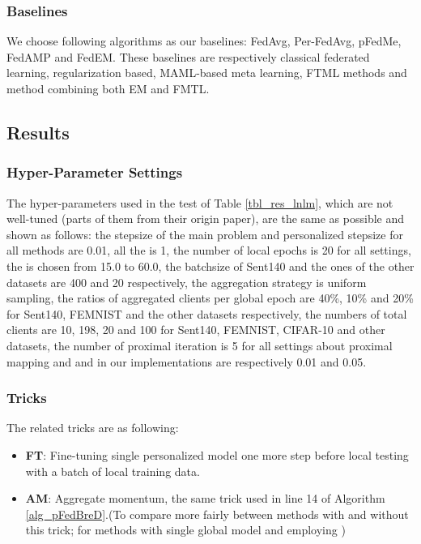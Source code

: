 \documentclass{article}
\begin{document}
\subsubsection{Baselines}
\label{sssec_bl}

We choose following algorithms as our baselines: FedAvg, Per-FedAvg, pFedMe, FedAMP and FedEM\cite{marfoq2021federated}. These baselines are respectively classical federated learning, regularization based, MAML-based meta learning, FTML methods and method combining both EM and FMTL.

\subsection{Results}
\label{ssec_expr}

\subsubsection{Hyper-Parameter Settings}
\label{sssec_hps}

The hyper-parameters used in the test of Table \ref{tbl_res_lnlm}, which are not well-tuned (parts of them from their origin paper), are the same as possible and shown as follows: the stepsize of the main problem  and personalized stepsize  for all methods are 0.01, all the  is 1, the number of local epochs  is 20 for all settings, the  is chosen from 15.0 to 60.0, the batchsize of Sent140 and the ones of the other datasets are 400 and 20 respectively, the aggregation strategy  is uniform sampling, the ratios of aggregated clients per global epoch are 40\%, 10\% and 20\% for Sent140, FEMNIST and the other datasets respectively, the numbers of total clients  are 10, 198, 20 and 100 for Sent140, FEMNIST, CIFAR-10 and other datasets, the number of proximal iteration is 5 for all settings about proximal mapping and  and  in our implementations are respectively 0.01 and 0.05.

\subsubsection{Tricks}
\label{sssec_tricks}

The related tricks are as following:
\begin{itemize}
    \item \textbf{FT}: Fine-tuning single personalized model one more step before local testing with a batch of local training data.
    \item \textbf{AM}: Aggregate momentum, the same trick used in line 14 of Algorithm \ref{alg_pFedBreD}.(To compare more fairly between methods with and without this trick;  for methods with single global model and employing )
\end{itemize}
\end{document}
